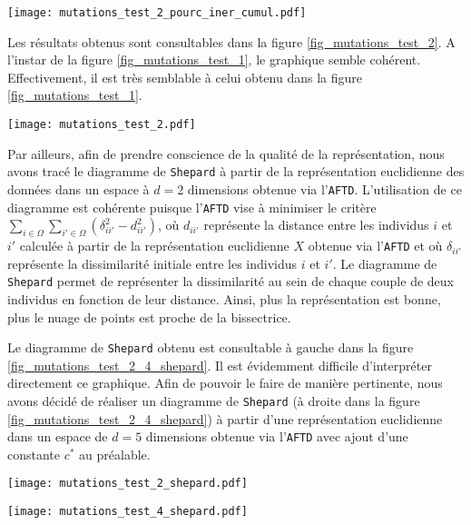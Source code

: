 \documentclass{article}
\begin{document}
\begin{multicols}{2}
\begingroup
   \centering
   \texttt{[image: mutations\_test\_2\_pourc\_iner\_cumul.pdf]}
    \label{fig_mutations_test_2_pourc_iner_cumul}
\endgroup

Les résultats obtenus sont consultables dans la figure \ref{fig_mutations_test_2}. A l'instar de la figure \ref{fig_mutations_test_1}, le graphique semble cohérent. Effectivement, il est très semblable à celui obtenu dans la figure \ref{fig_mutations_test_1}.

\begingroup
   \centering
   \texttt{[image: mutations\_test\_2.pdf]}
    \label{fig_mutations_test_2}
\endgroup

Par ailleurs, afin de prendre conscience de la qualité de la représentation, nous avons tracé le diagramme de \texttt{Shepard} à partir de la représentation euclidienne des données dans un espace à $d = 2$ dimensions obtenue via l'\texttt{AFTD}. L'utilisation de ce diagramme est cohérente puisque l'\texttt{AFTD} vise à minimiser le critère $\sum_{i \in \Omega} \sum_{i' \in \Omega}(\delta_{ii'}^{2} - d_{ii'}^{2})$, où $d_{ii'}$ représente la distance entre les individus $i$ et $i'$ calculée à partir de la représentation euclidienne $X$ obtenue via l'\texttt{AFTD} et où $\delta_{ii'}$ représente la dissimilarité initiale entre les individus $i$ et $i'$. Le diagramme de \texttt{Shepard} permet de représenter la dissimilarité au sein de chaque couple de deux individus en fonction de leur distance. Ainsi, plus la représentation est bonne, plus le nuage de points est proche de la bissectrice.

Le diagramme de \texttt{Shepard} obtenu est consultable à gauche dans la figure \ref{fig_mutations_test_2_4_shepard}. Il est évidemment difficile d'interpréter directement ce graphique. Afin de pouvoir le faire de manière pertinente, nous avons décidé de réaliser un diagramme de \texttt{Shepard} (à droite dans la figure \ref{fig_mutations_test_2_4_shepard}) à partir d'une représentation euclidienne dans un espace de $d = 5$ dimensions obtenue via l'\texttt{AFTD} avec ajout d'une constante $c^{\ast}$ au préalable.

\begingroup
	\centering
   \begin{minipage}[c]{0.23\textwidth}
      \centering \texttt{[image: mutations\_test\_2\_shepard.pdf]}
   \end{minipage}\hfill
   \begin{minipage}[c]{0.23\textwidth}   
      \centering \texttt{[image: mutations\_test\_4\_shepard.pdf]}
   \end{minipage}
     \label{fig_mutations_test_2_4_shepard}
\endgroup



\end{multicols}
\end{document}
